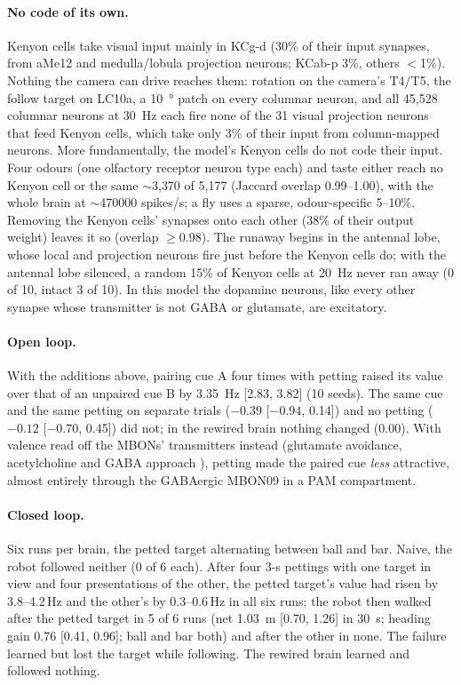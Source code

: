 \documentclass[10pt,a4paper]{article}
\begin{document}
\paragraph{No code of its own.} Kenyon cells take visual input mainly in KCg-d (30\% of their input
synapses, from aMe12 and medulla/lobula projection neurons; KCab-p 3\%, others $<$1\%). Nothing the
camera can drive reaches them: rotation on the camera's T4/T5, the follow target on LC10a, a
\SI{10}{\degree} patch on every columnar neuron, and all 45{,}528 columnar neurons at \SI{30}{Hz} each
fire none of the 31 visual projection neurons that feed Kenyon cells, which take only 3\% of their
input from column-mapped neurons. More fundamentally, the model's Kenyon cells do not code their
input. Four odours (one olfactory receptor neuron type each) and taste either reach no Kenyon cell or
the same $\sim$3{,}370 of 5{,}177 (Jaccard overlap 0.99--1.00), with the whole brain at
$\sim$\num{470000} spikes/s; a fly uses a sparse, odour-specific 5--10\%. Removing the Kenyon cells'
synapses onto each other (38\% of their output weight) leaves it so (overlap $\geq 0.98$). The runaway
begins in the antennal lobe, whose local and projection neurons fire just before the Kenyon cells
do; with the antennal lobe silenced, a random 15\% of Kenyon cells at \SI{20}{Hz} never ran away
(0 of 10, intact 3 of 10). In this model the dopamine neurons, like every other synapse whose
transmitter is not GABA or glutamate, are excitatory.

\paragraph{Open loop.} With the additions above, pairing cue A four times with petting raised its
value over that of an unpaired cue B by \SI{3.35}{Hz} [2.83, 3.82] (10 seeds). The same cue and the
same petting on separate trials ($-0.39$ [$-0.94$, 0.14]) and no petting ($-0.12$ [$-0.70$, 0.45])
did not; in the rewired brain nothing changed (0.00). With valence read off the MBONs' transmitters
instead (glutamate avoidance, acetylcholine and GABA approach \cite{aso2014b}), petting made the
paired cue \emph{less} attractive, almost entirely through the GABAergic MBON09 in a PAM compartment.

\paragraph{Closed loop.} Six runs per brain, the petted target alternating between ball and bar.
Naive, the robot followed neither (0 of 6 each). After four 3-s pettings with one target in view
and four presentations of the other, the petted target's value had risen by 3.8--4.2\,Hz and the
other's by 0.3--0.6\,Hz in all six runs; the robot then walked after the petted target in 5 of 6 runs
(net \SI{1.03}{m} [0.70, 1.26] in \SI{30}{s}; heading gain 0.76 [0.41, 0.96]; ball and bar both) and
after the other in none. The failure learned but lost the target while following. The rewired brain learned and followed nothing.
\end{document}
